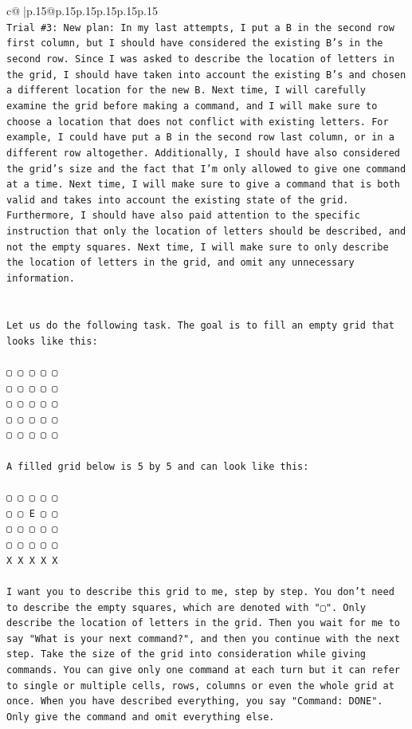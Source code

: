 \documentclass{article}
\begin{document}
{\begin{supertabular}{c@{$\;$}|p{.15\linewidth}@{}p{.15\linewidth}p{.15\linewidth}p{.15\linewidth}p{.15\linewidth}p{.15\linewidth}}
{{{\\ 
\texttt{Trial \#3: New plan: In my last attempts, I put a B in the second row first column, but I should have considered the existing B's in the second row. Since I was asked to describe the location of letters in the grid, I should have taken into account the existing B's and chosen a different location for the new B. Next time, I will carefully examine the grid before making a command, and I will make sure to choose a location that does not conflict with existing letters. For example, I could have put a B in the second row last column, or in a different row altogether. Additionally, I should have also considered the grid's size and the fact that I'm only allowed to give one command at a time. Next time, I will make sure to give a command that is both valid and takes into account the existing state of the grid. Furthermore, I should have also paid attention to the specific instruction that only the location of letters should be described, and not the empty squares. Next time, I will make sure to only describe the location of letters in the grid, and omit any unnecessary information.} \\
\\ 
\\ 
\texttt{Let us do the following task. The goal is to fill an empty grid that looks like this:} \\
\\ 
\texttt{▢ ▢ ▢ ▢ ▢} \\
\texttt{▢ ▢ ▢ ▢ ▢} \\
\texttt{▢ ▢ ▢ ▢ ▢} \\
\texttt{▢ ▢ ▢ ▢ ▢} \\
\texttt{▢ ▢ ▢ ▢ ▢} \\
\\ 
\texttt{A filled grid below is 5 by 5 and can look like this:} \\
\\ 
\texttt{▢ ▢ ▢ ▢ ▢} \\
\texttt{▢ ▢ E ▢ ▢} \\
\texttt{▢ ▢ ▢ ▢ ▢} \\
\texttt{▢ ▢ ▢ ▢ ▢} \\
\texttt{X X X X X} \\
\\ 
\texttt{I want you to describe this grid to me, step by step. You don't need to describe the empty squares, which are denoted with "▢". Only describe the location of letters in the grid. Then you wait for me to say "What is your next command?", and then you continue with the next step. Take the size of the grid into consideration while giving commands. You can give only one command at each turn but it can refer to single or multiple cells, rows, columns or even the whole grid at once. When you have described everything, you say "Command: DONE". Only give the command and omit everything else.} \\
}}}
\end{supertabular}}
\end{document}
